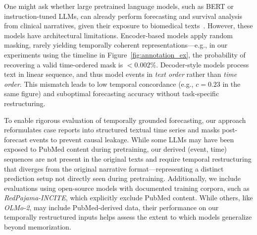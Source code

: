 
One might ask whether large pretrained language models, such as BERT or instruction-tuned LLMs, can already perform forecasting and survival analysis from clinical narratives, given their exposure to biomedical texts~\citep{peng2020empirical,weber2024redpajama}. However, these models have architectural limitations.
Encoder-based models apply random masking, rarely yielding temporally coherent representations—e.g., in our experiments using the timeline in Figure~\ref{fig:annotation_ex}, the probability of recovering a valid time-ordered mask is $< 0.002\%$. Decoder-style models process text in linear sequence, and thus model events in \emph{text order} rather than \emph{time order}. This mismatch leads to low temporal concordance (e.g., $c=0.23$ in the same figure) and suboptimal forecasting accuracy without task-specific restructuring.

To enable rigorous evaluation of temporally grounded forecasting, our approach reformulates case reports into structured textual time series and masks post-forecast events to prevent causal leakage. While some LLMs may have been exposed to PubMed content during pretraining, our derived (event, time) sequences are not present in the original texts and require temporal restructuring that diverges from the original narrative format—representing a distinct prediction setup not directly seen during pretraining. Additionally, we include evaluations using open-source models with documented training corpora, such as \textit{RedPajama-INCITE}, which explicitly exclude PubMed content. While others, like \textit{OLMo-2}, may include PubMed-derived data, their performance on our temporally restructured inputs helps assess the extent to which models generalize beyond memorization.

